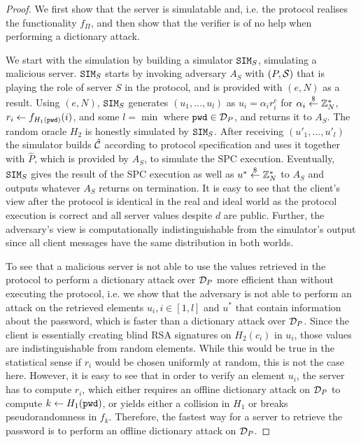 \begin{proof}
  We first show that the server is simulatable and, i.e. the protocol realises the functionality $f_\Pi$, and then show that the verifier \ver is of no help when performing a dictionary attack.
  
  We start with the simulation by building a simulator $\mathtt{SIM}_S$, simulating a malicious server.
  $\mathtt{SIM}_S$ starts by invoking adversary $A_S$ with $(P, \mathcal{S})$ that is playing the role of server $S$ in the protocol, and is provided with $(e,N)$ as a result.
  Using $(e,N)$, $\mathtt{SIM}_S$ generates $(u_1, \dots, u_l)$ as $u_i=\alpha_i r_i^e$ for $\alpha_i\stackrel{\$}{\gets} \mathbb{Z}^\ast_N$, $r_i\gets f_{H_1(\mathtt{pwd})}(i)$, and some $l=\min$ where $\mathtt{pwd}\in\mathcal{D}_P$, and returns it to $A_S$.
  The random oracle $H_2$ is honestly simulated by $\mathtt{SIM}_S$.
  After receiving $(u'_1, \dots, u'_l)$ the simulator builds $\hat{\mathcal{C}}$ according to protocol specification and uses it together with $\hat{P}$, which is provided by $A_S$, to simulate the SPC execution.
  Eventually, $\mathtt{SIM}_S$ gives the result of the SPC execution as well as $u^\ast\stackrel{\$}{\gets}\mathbb{Z}^\ast_N$ to $A_S$ and outputs whatever $A_S$ returns on termination.
  It is easy to see that the client's view after the protocol is identical in the real and ideal world as the protocol execution is correct and all server values despite $d$ are public.
  Further, the adversary's view is computationally indistinguishable from the simulator's output since all client messages have the same distribution in both worlds.
  
  To see that a malicious server is not able to use the values retrieved in the protocol to perform a dictionary attack over $\mathcal{D}_P$ more efficient than without executing the protocol, i.e. we show that the adversary is not able to perform an attack on the retrieved elements $u_i, i\in[1,l]$ and $u^\ast$ that contain information about the password, which is faster than a dictionary attack over $\mathcal{D}_P$.
  Since the client is essentially creating blind RSA signatures on $H_2(c_i)$ in $u_i$, those values are indistinguishable from random elements.
  While this would be true in the statistical sense if $r_i$ would be chosen uniformly at random, this is not the case here.
  However, it is easy to see that in order to verify an element $u_i$, the server has to compute $r_i$, which either requires an offline dictionary attack on $\mathcal{D}_P$ to compute $k\gets H_1(\mathtt{pwd})$, or yields either a collision in $H_1$ or breaks pseudorandomness in $f_k$.
  Therefore, the fastest way for a server to retrieve the password is to perform an offline dictionary attack on $\mathcal{D}_P$.
  
\end{proof}

